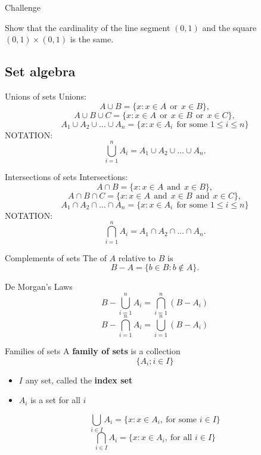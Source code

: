 \documentclass{beamer}
\begin{document}
\begin{frame}{Challenge}
\begin{prob}
Show that the cardinality of the line segment $(0,1)$ and the square $(0,1)\times (0,1)$ is the same.
\end{prob}
\end{frame}

\subsection{Set algebra}

\begin{frame}{Unions of sets}
Unions:
\pause
$$A\cup B = \{x: x\in A\ \ \text{or}\ \ x\in B\},$$
\pause
$$A\cup B\cup C = \{x: x\in A\ \ \text{or}\ \ x\in B\ \ \text{or}\ \ x\in C\},$$
\pause
$$A_1\cup A_2\cup \dots \cup A_n = \{x: x\in A_i\ \ \text{for some $1\leq i\leq n$}\}$$
\pause
{\color{red}NOTATION:}
$$\bigcup_{i=1}^n A_i = A_1\cup A_2\cup \dots \cup A_n.$$
\end{frame}

\begin{frame}{Intersections of sets}
Intersections:
\pause
$$A\cap B = \{x: x\in A\ \ \text{and}\ \ x\in B\},$$
\pause
$$A\cap B\cap C = \{x: x\in A\ \ \text{and}\ \ x\in B\ \ \text{and}\ \ x\in C\},$$
\pause
$$A_1\cap A_2\cap \dots \cap A_n = \{x: x\in A_i\ \ \text{for some $1\leq i\leq n$}\}$$
\pause
{\color{red}NOTATION:}
$$\bigcap_{i=1}^n A_i = A_1\cap A_2\cap \dots \cap A_n.$$
\end{frame}

\begin{frame}{Complements of sets}
\pause
The  of $A$ relative to $B$ is
$$B-A = \{b\in B: b\notin A\}.$$
\pause
\begin{thm}{De Morgan's Laws}
\pause
$$B-\bigcup_{i=1}^n A_i = \bigcap_{i=1}^n (B-A_i)$$
\pause
$$B-\bigcap_{i=1}^n A_i = \bigcup_{i=1}^n (B-A_i)$$
\end{thm}
\end{frame}


\begin{frame}{Families of sets}
A \textbf{family of sets} is a collection
$$\{A_i; i\in I\}$$
\begin{itemize}
\pause
\item $I$ any set, called the \textbf{index set}
\pause
\item $A_i$ is a set for all $i$
\end{itemize}
\pause
$$\bigcup_{i\in I} A_i = \{x: x\in A_i,\ \text{for some $i\in I$}\}$$
\pause
$$\bigcap_{i\in I} A_i = \{x: x\in A_i,\ \text{for all $i\in I$}\}$$
\end{frame}
\end{document}

